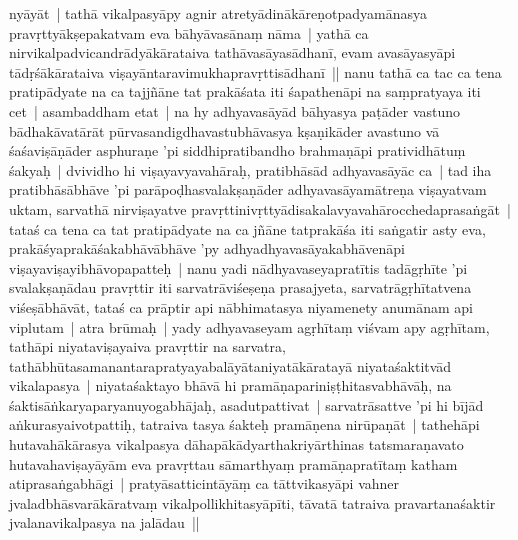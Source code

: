 \documentclass[article,12pt,a4paper]{memoir}%
\newcounter{parCount}
\begin{document}
	  
	  \pstart \leavevmode%
	nyāyāt | tathā vikalpasyāpy agnir atretyādinākāreṇotpadyamānasya pravṛttyākṣepakatvam eva bāhyāvasānaṃ nāma | yathā ca nirvikalpadvicandrādyākārataiva tathāvasāyasādhanī, evam avasāyasyāpi tādṛśākārataiva viṣayāntaravimukhapravṛttisādhanī || \label{thakur75-137.25} nanu tathā ca tac ca tena pratipādyate na ca tajjñāne tat prakāśata iti śapathenāpi na saṃpratyaya iti cet | asambaddham etat | na hy adhyavasāyād bāhyasya paṭāder vastuno bādhakāvatārāt pūrvasandigdhavastubhāvasya kṣaṇikāder avastuno vā śaśaviṣāṇāder asphuraṇe 'pi siddhipratibandho brahmaṇāpi pratividhātuṃ śakyaḥ | dvividho hi viṣayavyavahāraḥ, pratibhāsād adhyavasāyāc ca | tad iha pratibhāsābhāve 'pi parāpoḍhasvalakṣaṇāder adhyavasāyamātreṇa viṣayatvam uktam, sarvathā nirviṣayatve pravṛttinivṛttyādisakalavyavahārocchedaprasaṅgāt | tataś ca tena ca tat pratipādyate na ca jñāne tatprakāśa iti saṅgatir asty eva, prakāśyaprakāśakabhāvābhāve 'py \label{ratnakīrtinibandhāvali__36r1PF7IMRXJYE54SUH8HG2DO14}adhya\label{ratnakīrtinibandhāvali__36r1PF7IMRVGV16KLF4NAL7T8DL}dhyavasāyakabhāvenāpi viṣayaviṣayibhāvopapatteḥ | \label{thakur75-138.1} nanu yadi nādhyavaseyapratītis tadāgṛhīte 'pi svalakṣaṇādau pravṛttir iti sarvatrāviśeṣeṇa prasajyeta, sarvatrāgṛhītatvena viśeṣābhāvāt, tataś ca prāptir api nābhimatasya niyamenety anumānam api viplutam | atra brūmaḥ | yady adhyavaseyam agṛhītaṃ viśvam apy agṛhītam, tathāpi niyataviṣayaiva pravṛttir na sarvatra, tathābhūtasamanantarapratyayabalāyātaniyatākāratayā niyataśaktitvād vikalapasya | niyataśaktayo bhāvā hi pramāṇapariniṣṭhitasvabhāvāḥ, na śaktisāṅkaryaparyanuyogabhājaḥ, asadutpattivat | sarvatrāsattve 'pi hi bījād aṅkurasyaivotpattiḥ, tatraiva tasya śakteḥ pramāṇena nirūpaṇāt | tathehāpi hutavahākārasya vikalpasya dāhapākādyarthakriyārthinas tatsmaraṇavato hutavahaviṣayāyām eva pravṛttau sāmarthyaṃ pramāṇapratītaṃ katham atiprasaṅgabhāgi | pratyāsatticintāyāṃ ca tāttvikasyāpi vahner jvaladbhāsvarākā\label{capv-np-13a-start}ratvaṃ vikalpollikhitasyāpīti, tāvatā tatraiva pravartanaśaktir jvalanavikalpasya na jalādau ||
	{}
	\pend%
      
\end{document}
